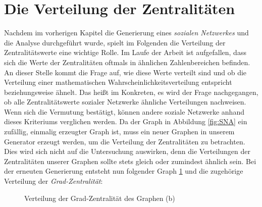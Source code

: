 \section{Die Verteilung der Zentralitäten}
Nachdem im vorherigen Kapitel die Generierung eines \textit{sozialen Netzwerkes} und die Analyse durchgeführt wurde, spielt im Folgenden die Verteilung der Zentralitätswerte eine wichtige Rolle.
Im Laufe der Arbeit ist aufgefallen, dass sich die Werte der Zentralitäten oftmals in ähnlichen Zahlenbereichen befinden. An dieser Stelle kommt die Frage auf, wie diese Werte verteilt sind und ob die Verteilung einer mathematischen Wahrscheinlichkeitsverteilung entspricht beziehungsweise ähnelt. Das heißt im Konkreten, es wird der Frage nachgegangen, ob alle Zentralitätswerte sozialer Netzwerke ähnliche Verteilungen nachweisen. Wenn sich die Vermutung bestätigt, können andere soziale Netzwerke anhand dieses Kriteriums verglichen werden.
Da der Graph in Abbildung \ref{fig:SNA} ein zufällig, einmalig erzeugter Graph ist, muss ein neuer Graphen in unserem Generator erzeugt werden, um die Verteilung der Zentralitäten zu betrachten. Dies wird sich nicht auf die Untersuchung auswirken, denn die Verteilungen der Zentralitäten unserer Graphen sollte stets gleich oder zumindest ähnlich sein. Bei der erneuten Generierung entsteht nun folgender Graph \ref{fig:distribution} und die zugehörige Verteilung der \textit{Grad-Zentralität}:

\FloatBarrier
\begin{figure}[h!]%
  \centering
  \qquad
  \caption{Verteilung der Grad-Zentralität des Graphen (b)}%
  \label{fig:distribution}
\end{figure}
\FloatBarrier

